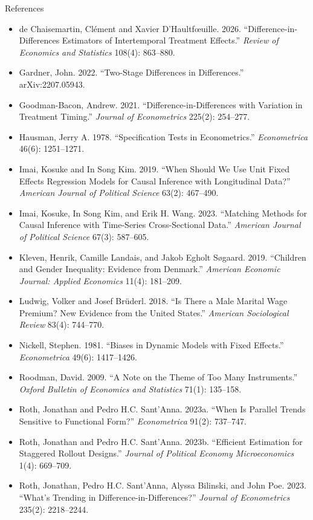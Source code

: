 \documentclass[aspectratio=169,11pt,xcolor=dvipsnames]{beamer}
\begin{document}
\begin{frame}[allowframebreaks,t]{References}
\begin{itemize}
\item de Chaisemartin, Cl\'ement and Xavier D'Haultf\oe uille. 2026. ``Difference-in-Differences Estimators of Intertemporal Treatment Effects.'' \textit{Review of Economics and Statistics} 108(4): 863--880.
\item Gardner, John. 2022. ``Two-Stage Differences in Differences.'' arXiv:2207.05943.
\item Goodman-Bacon, Andrew. 2021. ``Difference-in-Differences with Variation in Treatment Timing.'' \textit{Journal of Econometrics} 225(2): 254--277.
\item Hausman, Jerry A. 1978. ``Specification Tests in Econometrics.'' \textit{Econometrica} 46(6): 1251--1271.
\item Imai, Kosuke and In Song Kim. 2019. ``When Should We Use Unit Fixed Effects Regression Models for Causal Inference with Longitudinal Data?'' \textit{American Journal of Political Science} 63(2): 467--490.
\item Imai, Kosuke, In Song Kim, and Erik H. Wang. 2023. ``Matching Methods for Causal Inference with Time-Series Cross-Sectional Data.'' \textit{American Journal of Political Science} 67(3): 587--605.
\item Kleven, Henrik, Camille Landais, and Jakob Egholt Søgaard. 2019. ``Children and Gender Inequality: Evidence from Denmark.'' \textit{American Economic Journal: Applied Economics} 11(4): 181--209.
\item Ludwig, Volker and Josef Brüderl. 2018. ``Is There a Male Marital Wage Premium? New Evidence from the United States.'' \textit{American Sociological Review} 83(4): 744--770.
\item Nickell, Stephen. 1981. ``Biases in Dynamic Models with Fixed Effects.'' \textit{Econometrica} 49(6): 1417--1426.
\item Roodman, David. 2009. ``A Note on the Theme of Too Many Instruments.'' \textit{Oxford Bulletin of Economics and Statistics} 71(1): 135--158.
\item Roth, Jonathan and Pedro H.C. Sant'Anna. 2023a. ``When Is Parallel Trends Sensitive to Functional Form?'' \textit{Econometrica} 91(2): 737--747.
\item Roth, Jonathan and Pedro H.C. Sant'Anna. 2023b. ``Efficient Estimation for Staggered Rollout Designs.'' \textit{Journal of Political Economy Microeconomics} 1(4): 669--709.
\item Roth, Jonathan, Pedro H.C. Sant'Anna, Alyssa Bilinski, and John Poe. 2023. ``What's Trending in Difference-in-Differences?'' \textit{Journal of Econometrics} 235(2): 2218--2244.

\end{itemize}
\end{frame}
\end{document}
